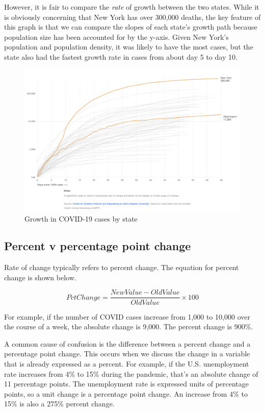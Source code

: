 \documentclass[
]{book}
\begin{document}
However, it is fair to compare the \emph{rate} of growth between the two states. While it is obviously concerning that New York has over 300,000 deaths, the key feature of this graph is that we can compare the slopes of each state's growth path because population size has been accounted for by the y-axis. Given New York's population and population density, it was likely to have the most cases, but the state also had the fastest growth rate in cases from about day 5 to day 10.

\begin{figure}
\includegraphics[width=14.11in]{images/logs_covid} \caption{Growth in COVID-19 cases by state}\label{fig:logcovid}
\end{figure}

\hypertarget{percent-v-percentage-point-change}{%
\subsection{Percent v percentage point change}\label{percent-v-percentage-point-change}}

Rate of change typically refers to percent change. The equation for percent change is shown below.

\begin{equation}
PctChange = {\frac{NewValue-OldValue}{OldValue}} \times 100
\label{eq:pctchange}
\end{equation}

For example, if the number of COVID cases increase from 1,000 to 10,000 over the course of a week, the absolute change is 9,000. The percent change is 900\%.

A common cause of confusion is the difference between a percent change and a percentage point change. This occurs when we discuss the change in a variable that is already expressed as a percent. For example, if the U.S. unemployment rate increases from 4\% to 15\% during the pandemic, that's an absolute change of 11 percentage points. The unemployment rate is expressed units of percentage points, so a unit change is a percentage point change. An increase from 4\% to 15\% is also a 275\% percent change.
\end{document}
